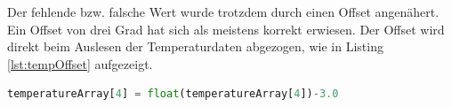 \noindent
Der fehlende bzw. falsche Wert wurde trotzdem durch einen Offset angenähert. Ein Offset von drei Grad hat sich als meistens korrekt erwiesen. Der Offset wird direkt beim Auslesen der Temperaturdaten abgezogen, wie in Listing \ref{lst:tempOffset} aufgezeigt.

\vspace{3mm}
\begin{lstlisting}[label=lst:tempOffset,caption=Offset des defekten Temperatusensors, language=Python, style=py]
temperatureArray[4] = float(temperatureArray[4])-3.0
\end{lstlisting}
